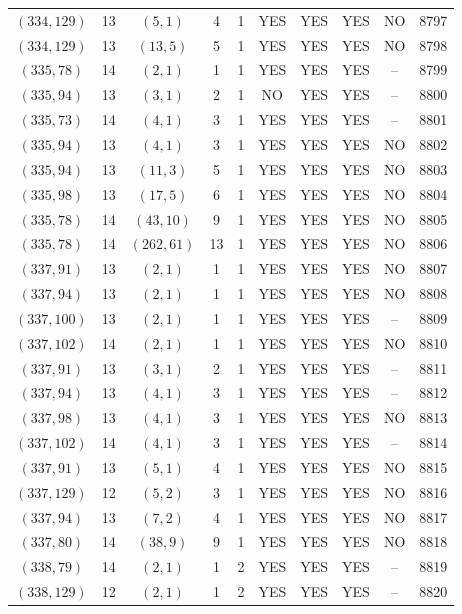 \begin{longtable}{|c|c|c|c|c|c|c|c|c|c|}
$(334, 129)$ & 13 & $(5, 1)$ & 4 & 1 & YES & YES & YES & NO & 8797\\
$(334, 129)$ & 13 & $(13, 5)$ & 5 & 1 & YES & YES & YES & NO & 8798\\
$(335, 78)$ & 14 & $(2, 1)$ & 1 & 1 & YES & YES & YES & -- & 8799\\
$(335, 94)$ & 13 & $(3, 1)$ & 2 & 1 & NO & YES & YES & -- & 8800\\
$(335, 73)$ & 14 & $(4, 1)$ & 3 & 1 & YES & YES & YES & -- & 8801\\
$(335, 94)$ & 13 & $(4, 1)$ & 3 & 1 & YES & YES & YES & NO & 8802\\
$(335, 94)$ & 13 & $(11, 3)$ & 5 & 1 & YES & YES & YES & NO & 8803\\
$(335, 98)$ & 13 & $(17, 5)$ & 6 & 1 & YES & YES & YES & NO & 8804\\
$(335, 78)$ & 14 & $(43, 10)$ & 9 & 1 & YES & YES & YES & NO & 8805\\
$(335, 78)$ & 14 & $(262, 61)$ & 13 & 1 & YES & YES & YES & NO & 8806\\
$(337, 91)$ & 13 & $(2, 1)$ & 1 & 1 & YES & YES & YES & NO & 8807\\
$(337, 94)$ & 13 & $(2, 1)$ & 1 & 1 & YES & YES & YES & NO & 8808\\
$(337, 100)$ & 13 & $(2, 1)$ & 1 & 1 & YES & YES & YES & -- & 8809\\
$(337, 102)$ & 14 & $(2, 1)$ & 1 & 1 & YES & YES & YES & NO & 8810\\
$(337, 91)$ & 13 & $(3, 1)$ & 2 & 1 & YES & YES & YES & -- & 8811\\
$(337, 94)$ & 13 & $(4, 1)$ & 3 & 1 & YES & YES & YES & -- & 8812\\
$(337, 98)$ & 13 & $(4, 1)$ & 3 & 1 & YES & YES & YES & NO & 8813\\
$(337, 102)$ & 14 & $(4, 1)$ & 3 & 1 & YES & YES & YES & -- & 8814\\
$(337, 91)$ & 13 & $(5, 1)$ & 4 & 1 & YES & YES & YES & NO & 8815\\
$(337, 129)$ & 12 & $(5, 2)$ & 3 & 1 & YES & YES & YES & NO & 8816\\
$(337, 94)$ & 13 & $(7, 2)$ & 4 & 1 & YES & YES & YES & NO & 8817\\
$(337, 80)$ & 14 & $(38, 9)$ & 9 & 1 & YES & YES & YES & NO & 8818\\
$(338, 79)$ & 14 & $(2, 1)$ & 1 & 2 & YES & YES & YES & -- & 8819\\
$(338, 129)$ & 12 & $(2, 1)$ & 1 & 2 & YES & YES & YES & -- & 8820\\

\end{longtable}
